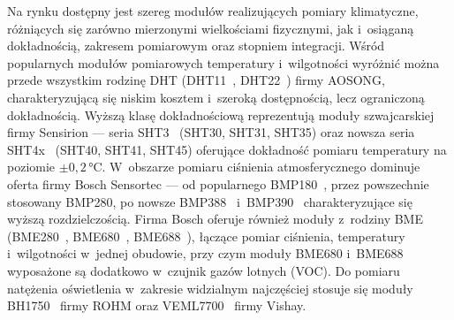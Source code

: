 Na rynku dostępny jest szereg modułów realizujących pomiary 
klimatyczne, różniących się zarówno mierzonymi wielkościami 
fizycznymi, jak i~osiąganą dokładnością, zakresem pomiarowym 
oraz stopniem integracji. Wśród popularnych modułów pomiarowych 
temperatury i~wilgotności wyróżnić można przede wszystkim rodzinę 
DHT (DHT11~\cite{dht11_datasheet}, DHT22~\cite{dht22_datasheet}) firmy AOSONG, charakteryzującą się niskim kosztem 
i~szeroką dostępnością, lecz ograniczoną dokładnością. 
Wyższą klasę dokładnościową reprezentują moduły szwajcarskiej firmy 
Sensirion --- seria SHT3~\cite{sht3x_datasheet} (SHT30, SHT31, SHT35) oraz nowsza seria 
SHT4x~\cite{sht4x_datasheet} (SHT40, SHT41, SHT45) oferujące dokładność pomiaru 
temperatury na poziomie $\pm0{,}2$\,°C. W~obszarze pomiaru 
ciśnienia atmosferycznego dominuje oferta firmy Bosch Sensortec --- 
od popularnego BMP180~\cite{bmp180_datasheet}, przez powszechnie stosowany BMP280\cite{bmp280_datasheet}, po 
nowsze BMP388~\cite{bmp388_datasheet} i~BMP390~\cite{bmp390_datasheet} charakteryzujące się wyższą rozdzielczością. 
Firma Bosch oferuje również moduły z~rodziny BME (BME280~\cite{bme280_datasheet}, BME680~\cite{bme680_product}, 
BME688~\cite{bme680_product}), łączące pomiar ciśnienia, temperatury i~wilgotności 
w~jednej obudowie, przy czym moduły BME680 i~BME688 wyposażone są 
dodatkowo w~czujnik gazów lotnych (VOC). Do pomiaru natężenia 
oświetlenia w~zakresie widzialnym najczęściej stosuje się moduły 
BH1750~\cite{bh1750_datasheet} firmy ROHM oraz VEML7700~\cite{veml7700_datasheet} firmy Vishay.

